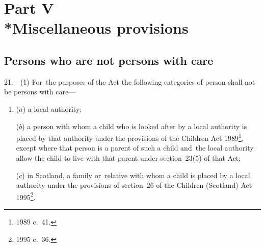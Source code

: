 \documentclass[12pt,a4paper]{article}
\begin{document}
%
%
%
%
%
%

\section[Part V --- Miscellaneous provisions]{Part V\\*Miscellaneous provisions}

\renewcommand\parthead{--- Part V}

\subsection[21. Persons who are not persons with care]{Persons who are not persons with care}

21.---(1)  For~the purposes of the Act the following categories of person shall not be persons with care—
\begin{enumerate}\item[]
($a$) a local authority;

($b$) a person with whom a child who is looked after by a local authority is placed by that authority under the provisions of the Children Act 1989\footnote{1989 c.\ 41.}, except where that person is a parent of such a child and~the local authority allow the child to live with that parent under section~23(5) of that Act;

($c$) in Scotland, a family or~relative with whom a child is placed by a local authority under the provisions of section~26 of the Children (Scotland) Act 1995\footnote{1995 c.\ 36.}.
\end{enumerate}
\end{document}
